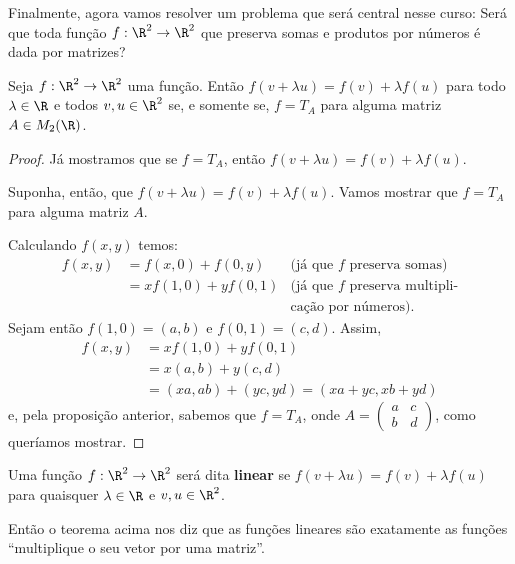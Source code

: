 Finalmente, agora vamos resolver um problema que será central nesse curso: Será que toda função $f:\R^2\to \R^2$ que preserva somas e produtos por números é dada por matrizes?

\begin{theorem}
	Seja $f:\R^2\to\R^2$ uma função. Então $f(v+\lambda u)=f(v)+\lambda f(u)$ para todo $\lambda\in \R$ e todos $v,u\in \R^2$ se, e somente se, $f=T_A$ para alguma matriz $A\in M_2(\R)$.
\end{theorem}
\begin{proof}
	Já mostramos que se $f=T_A$, então $f(v+\lambda u)=f(v)+\lambda f(u)$.
	
	Suponha, então, que $f(v+\lambda u)=f(v)+\lambda f(u)$. Vamos mostrar que $f=T_A$ para alguma matriz $A$.
	
	Calculando $f(x,y)$ temos:
	\[\begin{array}{rll}
		f(x,y)&=f(x,0)+f(0,y)&\mbox{(já que $f$ preserva somas)}\\
		&=xf(1,0)+yf(0,1)&\mbox{(já que $f$ preserva multipli-}\\
		&&\mbox{cação por números)}.
	\end{array}\]Sejam então $f(1,0)=(a,b)$ e $f(0,1)=(c,d)$. Assim,
	\[\begin{array}{rl}
	f(x,y)&=xf(1,0)+yf(0,1)\\
	&=x(a,b)+y(c,d)\\
	&=(xa,ab)+(yc,yd)=(xa+yc,xb+yd)
	\end{array}\]e, pela proposição anterior, sabemos que $f=T_A$, onde $A=\begin{pmatrix}
	a&c\\b&d
	\end{pmatrix}$, como queríamos mostrar.
\end{proof}

\begin{df}
	Uma função $f:\R^2\to \R^2$ será dita \textbf{linear} se $f(v+\lambda u)=f(v)+\lambda f(u)$ para quaisquer $\lambda\in \R$ e $v,u\in\R^2$.
\end{df}

Então o teorema acima nos diz que as funções lineares são exatamente as funções ``multiplique o seu vetor por uma matriz''.

